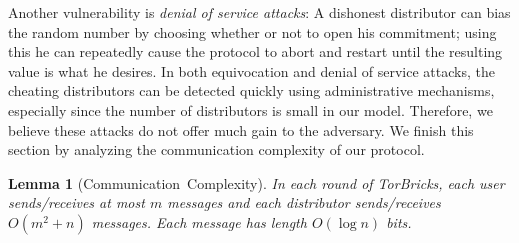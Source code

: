 \documentclass{sig-alternate-05-2015}
\newtheorem{lemma}{Lemma}
\newcommand{\bricks}{}
\def\bricks/{\mbox{TorBricks}}
\newcommand{\sfsize}{\fontsize{0.8\baselineskip}{0.68\baselineskip}\selectfont}
\newcommand{\sans}[1]{\textsf{\sfsize \mbox{#1}}}
\begin{document}
Another vulnerability is \emph{denial of service attacks}: A dishonest distributor can bias the random number by choosing whether or not to open his commitment; using this he can repeatedly cause the protocol to abort and restart until the resulting value is what he desires. In both equivocation and denial of service attacks, the cheating distributors can be detected quickly using administrative mechanisms, especially since the number of distributors is small in our model. Therefore, we believe these attacks do not offer much gain to the adversary.
We finish this section by analyzing the communication complexity of our protocol.
\begin{lemma}[\sans{Communication Complexity}]
	In each round of \bricks/, each user sends/receives at most $m$ messages and each distributor sends/receives ${O(m^2 + n)}$ messages. Each message has length $O(\log{n})$ bits.
\end{lemma}
\end{document}
